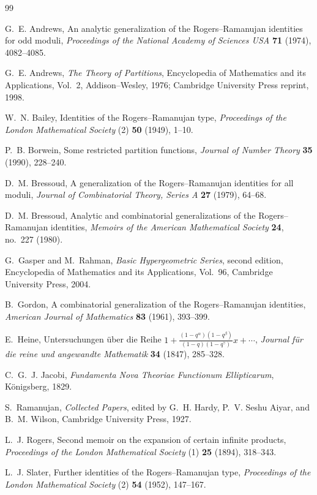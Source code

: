 \documentclass[11pt]{article}
\numberwithin{equation}{section}
\theoremstyle{definition}
\theoremstyle{remark}
\begin{document}
\begin{thebibliography}{99}

G.~E. Andrews,
\newblock An analytic generalization of the Rogers--Ramanujan identities for
odd moduli,
\newblock \emph{Proceedings of the National Academy of Sciences USA}
\textbf{71} (1974), 4082--4085.

G.~E. Andrews,
\newblock \emph{The Theory of Partitions},
\newblock Encyclopedia of Mathematics and its Applications, Vol.~2,
Addison--Wesley, 1976; Cambridge University Press reprint, 1998.

W.~N. Bailey,
\newblock Identities of the Rogers--Ramanujan type,
\newblock \emph{Proceedings of the London Mathematical Society} (2)
\textbf{50} (1949), 1--10.

P.~B. Borwein,
\newblock Some restricted partition functions,
\newblock \emph{Journal of Number Theory} \textbf{35} (1990), 228--240.

D.~M. Bressoud,
\newblock A generalization of the Rogers--Ramanujan identities for all
moduli,
\newblock \emph{Journal of Combinatorial Theory, Series A} \textbf{27}
(1979), 64--68.

D.~M. Bressoud,
\newblock Analytic and combinatorial generalizations of the
Rogers--Ramanujan identities,
\newblock \emph{Memoirs of the American Mathematical Society} \textbf{24},
no.~227 (1980).

G.~Gasper and M.~Rahman,
\newblock \emph{Basic Hypergeometric Series}, second edition,
\newblock Encyclopedia of Mathematics and its Applications, Vol.~96,
Cambridge University Press, 2004.

B.~Gordon,
\newblock A combinatorial generalization of the Rogers--Ramanujan identities,
\newblock \emph{American Journal of Mathematics} \textbf{83} (1961),
393--399.

E.~Heine,
\newblock Untersuchungen \"uber die Reihe
$1+\frac{(1-q^\alpha)(1-q^\beta)}{(1-q)(1-q^\gamma)}x+\cdots$,
\newblock \emph{Journal f\"ur die reine und angewandte Mathematik}
\textbf{34} (1847), 285--328.

C.~G.~J. Jacobi,
\newblock \emph{Fundamenta Nova Theoriae Functionum Ellipticarum},
\newblock K\"onigsberg, 1829.

S.~Ramanujan,
\newblock \emph{Collected Papers},
\newblock edited by G.~H. Hardy, P.~V. Seshu Aiyar, and B.~M. Wilson,
Cambridge University Press, 1927.

L.~J. Rogers,
\newblock Second memoir on the expansion of certain infinite products,
\newblock \emph{Proceedings of the London Mathematical Society} (1)
\textbf{25} (1894), 318--343.

L.~J. Slater,
\newblock Further identities of the Rogers--Ramanujan type,
\newblock \emph{Proceedings of the London Mathematical Society} (2)
\textbf{54} (1952), 147--167.

\end{thebibliography}
\end{document}

